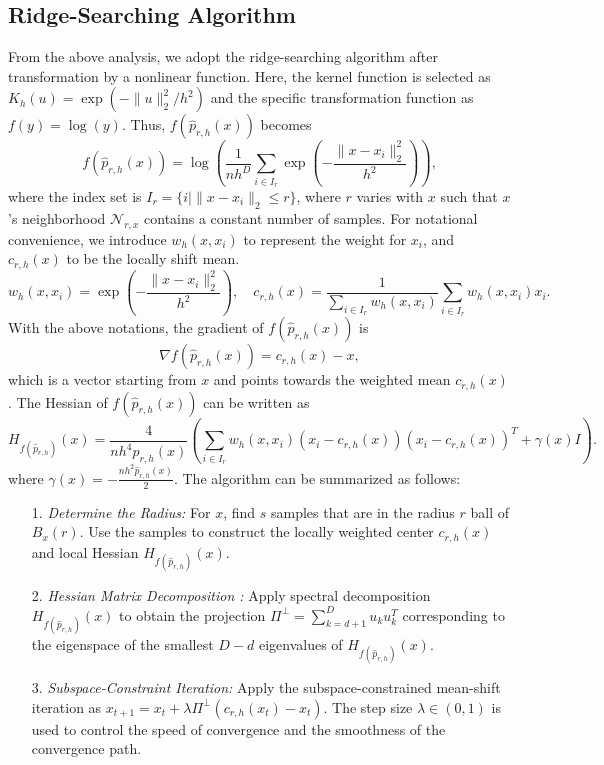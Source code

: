 \documentclass[aos,preprint]{imsart}
\theoremstyle{remark}
\begin{document}
\begin{appendix}
\section{Ridge-Searching Algorithm}
From the above analysis, we adopt the ridge-searching algorithm after transformation by a nonlinear function. Here, the kernel function is selected as $K_h(u) = \exp(-\|u\|_2^2/h^2)$ and the specific transformation function as $f(y) = \log(y)$. Thus, $f(\hat{p}_{r,h}(x))$ becomes
\[
f(\hat{p}_{r,h}(x)) = \log(\frac{1}{n h^D}\sum_{i\in I_{r}} \exp(-\frac{\|x-x_i\|_2^2}{h^2}) ),
\]
where the index set is $I_{r} = \{ i | \|x-x_i\|_2\leq r \}$, where $r$ varies with $x$ such that $x$'s neighborhood ${\mathcal N}_{r,x}$ contains a constant number of samples. For notational convenience, we introduce $w_h(x, x_i)$ to represent the weight for $x_i$, and $c_{r,h}(x)$ to be the locally shift mean.
\[
w_h(x, x_i) = \exp(-\frac{\|x-x_i\|_2^2}{h^2}), \quad c_{r,h}(x) = \frac{1}{\sum_{i\in I_r} w_h(x,x_i)}\sum_{i\in I_r} w_h(x, x_i)x_i.
\]
With the above notations, the gradient of $f(\hat{p}_{r,h}(x))$ is 
\[
\nabla f(\hat{p}_{r,h}(x)) = c_{r,h}(x) - x,
\] 
which is a vector starting from $x$ and points towards the weighted mean $c_{r,h}(x)$.
The Hessian of $f(\hat{p}_{r,h}(x))$ can be written as
\[
H_{f(\hat{p}_{r,h})}(x) = \frac{4}{n h^{4} \hat{p}_{r,h}(x)}(\sum_{i\in I_r} w_h(x,x_i) (x_i - c_{r,h}(x))(x_i - c_{r,h}(x))^T+
\gamma(x)I).
\]
where $\gamma(x) = -\frac{n h^2 \hat{p}_{r,h}(x)}{2}$.
The algorithm can be summarized as follows:
\begin{itemize}
\item[1.] {\it Determine the Radius:} For $x$, find $s$ samples that are in the radius $r$ ball of $B_x(r)$. Use the samples to construct the locally weighted center $c_{r,h}(x)$ and local Hessian $H_{f(\hat{p}_{r,h})}(x)$.
\item[2.] {\it Hessian Matrix Decomposition :} Apply spectral decomposition $H_{f(\hat{p}_{r,h})}(x)$ to obtain the projection $\Pi^{\perp}=\sum_{k = d+1}^D u_k u_k^T $ corresponding to the eigenspace of  the smallest $D-d$  eigenvalues of $H_{f(\hat{p}_{r,h})}(x)$. 
\item[3.] {\it Subspace-Constraint Iteration:} Apply the subspace-constrained mean-shift iteration as $x_{t+1} = x_t + \lambda \Pi^\perp (c_{r,h}(x_t) - x_t)$. 
The step size $\lambda\in (0,1)$ is used to control the speed of convergence and the smoothness of the convergence path.
\end{itemize}


\end{appendix}
\end{document}
